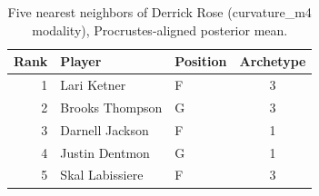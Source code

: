 \begin{table}[htbp]
  \centering\small
  \begin{tabular}{rllc}
    \toprule
    Rank & Player & Position & Archetype \\
    \midrule
    1 & Lari Ketner & F & 3 \\
    2 & Brooks Thompson & G & 3 \\
    3 & Darnell Jackson & F & 1 \\
    4 & Justin Dentmon & G & 1 \\
    5 & Skal Labissiere & F & 3 \\
    \bottomrule
  \end{tabular}
  \caption{Five nearest neighbors of Derrick Rose (curvature_m4 modality), Procrustes-aligned posterior mean.}
  \label{tab:Derrick_Rose_neighbors_curvature_m4}
\end{table}

